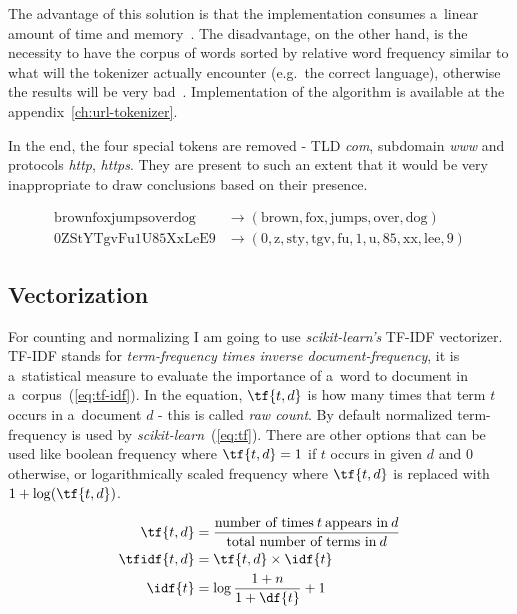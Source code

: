 The advantage of this solution is that the implementation consumes a~linear amount of time and memory~\cite{stackoverflow:tokenizer}.
The disadvantage, on the other hand, is the necessity to have the corpus of words sorted by relative word frequency similar to what will the tokenizer actually encounter (e.g.\ the correct language), otherwise the results will be very bad~\cite{stackoverflow:tokenizer}.
Implementation of the algorithm is available at the appendix~\ref{ch:url-tokenizer}.

In the end, the four special tokens are removed - TLD \textit{com}, subdomain \textit{www} and protocols \textit{http}, \textit{https}.
They are present to such an extent that it would be very inappropriate to draw conclusions based on their presence.

\begin{align*}
    \text{brownfoxjumpsoverdog} &\rightarrow \left( \text{brown}, \text{fox}, \text{jumps}, \text{over}, \text{dog} \right) \\
    \text{0ZStYTgvFu1U85XxLeE9} &\rightarrow \left( \text{0}, \text{z}, \text{sty}, \text{tgv}, \text{fu}, \text{1}, \text{u}, \text{85}, \text{xx}, \text{lee}, \text{9} \right)
\end{align*}

\subsection{Vectorization}\label{subsec:vectorization}

For counting and normalizing I am going to use \textit{scikit-learn's} TF-IDF vectorizer.
TF-IDF stands for \textit{term-frequency times inverse document-frequency}, it is a~statistical measure to evaluate the importance of a~word to document in a~corpus~(\ref{eq:tf-idf}).
In the equation, \( \tf{t, d} \) is how many times that term \( t \) occurs in a~document \( d \) - this is called \textit{raw count}.
By default normalized term-frequency is used by \textit{scikit-learn}~(\ref{eq:tf}).
There are other options that can be used like boolean frequency where \( \tf{t, d} = 1 \) if \( t \) occurs in given \( d \) and \( 0 \) otherwise, or logarithmically scaled frequency where \( \tf{t, d} \) is replaced with \( 1 + \log(\tf{t, d}) \).

\begin{align}
    \tf{t, d} &= \frac{\text{number of times} \: t \: \text{appears in} \: d}{\text{total number of terms in} \: d} \label{eq:tf} \\
    \tfidf{t, d} &= \tf{t, d} \times \idf{t} \label{eq:tf-idf} \\
    \idf{t} &= \log{\frac{1 + n}{1 + \df{t}}} + 1 \label{eq:idf}
\end{align}

